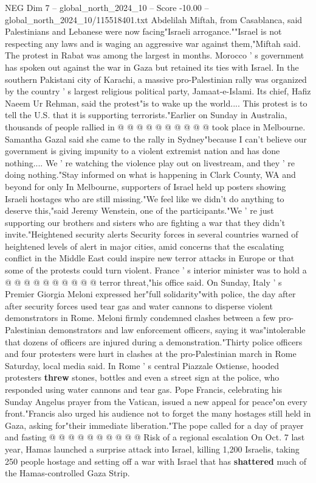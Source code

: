 \begin{textsample}{NEG Dim 7 – global\_north\_2024\_10 – Score -10.00 – global\_north\_2024\_10/115518401.txt}
Abdelilah Miftah, from Casablanca, said Palestinians and Lebanese were now facing"Israeli arrogance.""Israel is not respecting any laws and is waging an aggressive war against them,"Miftah said.
The protest in Rabat was among the largest in months.
Morocco ' s government has spoken out against the war in Gaza but retained its ties with Israel.
In the southern Pakistani city of Karachi, a massive pro-Palestinian rally was organized by the country ' s largest religious political party, Jamaat-e-Islami.
Its chief, Hafiz Naeem Ur Rehman, said the protest"is to wake up the world....
This protest is to tell the U.S. that it is supporting terrorists."Earlier on Sunday in Australia, thousands of people rallied in @ @ @ @ @ @ @ @ @ @ took place in Melbourne.
Samantha Gazal said she came to the rally in Sydney"because I can't believe our government is giving impunity to a violent extremist nation and has done nothing....
We ' re watching the violence play out on livestream, and they ' re doing nothing."Stay informed on what is happening in Clark County, WA and beyond for only In Melbourne, supporters of Israel held up posters showing Israeli hostages who are still missing."We feel like we didn't do anything to deserve this,"said Jeremy Wenstein, one of the participants."We ' re just supporting our brothers and sisters who are fighting a war that they didn't invite."Heightened security alerts Security forces in several countries warned of heightened levels of alert in major cities, amid concerns that the escalating conflict in the Middle East could inspire new terror attacks in Europe or that some of the protests could turn violent.
France ' s interior minister was to hold a @ @ @ @ @ @ @ @ @ @ terror threat,"his office said.
On Sunday, Italy ' s Premier Giorgia Meloni expressed her"full solidarity"with police, the day after after security forces used tear gas and water cannons to disperse violent demonstrators in Rome.
Meloni firmly condemned clashes between a few pro-Palestinian demonstrators and law enforcement officers, saying it was"intolerable that dozens of officers are injured during a demonstration."Thirty police officers and four protesters were hurt in clashes at the pro-Palestinian march in Rome Saturday, local media said.
In Rome ' s central Piazzale Ostiense, hooded protesters \textbf{threw} stones, bottles and even a street sign at the police, who responded using water cannons and tear gas.
Pope Francis, celebrating his Sunday Angelus prayer from the Vatican, issued a new appeal for peace"on every front."Francis also urged his audience not to forget the many hostages still held in Gaza, asking for"their immediate liberation."The pope called for a day of prayer and fasting @ @ @ @ @ @ @ @ @ @ Risk of a regional escalation On Oct. 7 last year, Hamas launched a surprise attack into Israel, killing 1,200 Israelis, taking 250 people hostage and setting off a war with Israel that has \textbf{shattered} much of the Hamas-controlled Gaza Strip.

\end{textsample}
